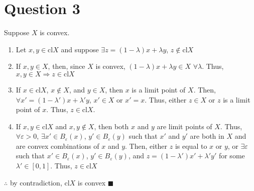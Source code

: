 \documentclass{article}
\newcommand{\cl}[1]{\text{cl}#1}
\begin{document}

\section*{Question 3}
Suppose $X$ is convex.
\begin{enumerate}
	\item Let $x,y\in\cl{X}$ and suppose $\exists z=(1-\lambda)x + \lambda y$, $z\notin\cl{X}$
	\item If $x,y\in X$, then, since $X$ is convex, $(1-\lambda)x + \lambda y\in X$ $\forall \lambda$. Thus, $x,y\in X\Rightarrow z\in\cl{X}$
	\item If $x\in\cl{X}$, $x\notin X$, and $y\in X$, then $x$ is a limit point of $X$. Then, $\forall x'=(1-\lambda')x + \lambda'y$, $x'\in X$ or $x'=x$. Thus, either $z\in X$ or $z$ is a limit point of $x$. Thus, $z\in\cl{X}$.
	\item If $x,y\in\cl{X}$ and $x,y\notin X$, then both $x$ and $y$ are limit points of $X$. Thus, $\forall\varepsilon>0$, $\exists x'\in B_\varepsilon(x)$, $y'\in B_\varepsilon(y)$ such that $x'$ and $y'$ are both in $X$ and are convex combinations of $x$ and $y$. Then, either $z$ is equal to $x$ or $y$, or $\exists\varepsilon$ such that $x'\in B_\varepsilon(x)$, $y'\in B_\varepsilon(y)$, and $z=(1-\lambda')x'+\lambda'y'$ for some $\lambda'\in[0,1]$. Thus, $z\in\cl{X}$
\end{enumerate}
$\therefore$ by contradiction, $\cl{X}$ is convex $\blacksquare$


\end{document}
